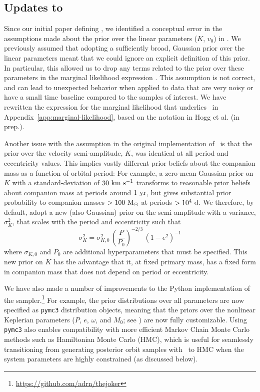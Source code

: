 \documentclass[modern]{aastex63}
\begin{document}
\subsection{Updates to \thejoker}
\label{sec:joker-update}

Since our initial paper defining \thejoker, we identified a conceptual error in
the assumptions made about the prior over the linear parameters ($K$, $v_0$) in
\citet{thejoker}.
We previously assumed that adopting a sufficiently broad, Gaussian prior over
the linear parameters meant that we could ignore an explicit definition of this
prior.
In particular, this allowed us to drop any terms related to the prior over these
parameters in the marginal likelihood expression \citep[\equationname~11
in][]{thejoker}.
This assumption is not correct, and can lead to unexpected behavior when applied
to data that are very noisy or have a small time baseline compared to the
samples of interest.
We have rewritten the expression for the marginal likelihood that underlies
\thejoker\ in Appendix~\ref{app:marginal-likelihood}, based on the notation in
Hogg et al. (in prep.).

Another issue with the assumption in the original implementation of \thejoker\
is that the prior over the velocity semi-amplitude, $K$, was identical at all
period and eccentricity values.
This implies vastly different prior beliefs about the companion mass as a
function of orbital period: For example, a zero-mean Gaussian prior on $K$ with
a standard-deviation of $30~\mathrm{km}~\mathrm{s}^{-1}$ transforms to reasonable prior beliefs about
companion mass at periods around $1~\mathrm{yr}$, but gives substantial prior
probability to companion masses $>100~\mathrm{M}_\odot$ at periods $>10^4~\mathrm{d}$.
We therefore, by default, adopt a new (also Gaussian) prior on the
semi-amplitude with a variance, $\sigma^2_K$, that scales with the
period and eccentricity such that
\begin{equation}
    \sigma^2_K = \sigma^2_{K, 0} \, \left(\frac{P}{P_0}\right)^{-2/3} \,
        \left(1 - e^2\right)^{-1} \label{eq:sigK}
\end{equation}
where $\sigma_{K, 0}$ and $P_0$ are additional hyperparameters that must be
specified.
This new prior on $K$ has the advantage that it, at fixed primary mass, has a
fixed form in companion mass that does not depend on period or eccentricity.

We have also made a number of improvements to the Python implementation of the
sampler.\footnote{\url{https://github.com/adrn/thejoker}}
For example, the prior distributions over all parameters are now specified as
\texttt{pymc3} \citep{Salvatier2016} distribution objects, meaning that the
priors over the nonlinear Keplerian parameters ($P$, $e$, $\omega$, and $M_0$;
see \citealt{thejoker}) are now fully customizable.
Using \texttt{pymc3} also enables compatibility with more efficient Markov Chain
Monte Carlo methods such as Hamiltonian Monte Carlo (HMC), which is useful for
seamlessly transitioning from generating posterior orbit samples with \thejoker\
to HMC when the system parameters are highly constrained (as discussed below).
\end{document}
